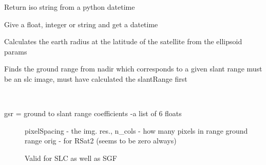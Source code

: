 \documentclass[letterpaper,10pt,english]{sphinxmanual}
\begin{document}

\begin{fulllineitems}
\label{code:Metadata.datetime2iso}
Return iso string from a python datetime

\end{fulllineitems}


\begin{fulllineitems}
\label{code:Metadata.doy2date}
Give a float, integer or string and get a datetime

\end{fulllineitems}


\begin{fulllineitems}
\label{code:Metadata.getEarthRadius}
Calculates the earth radius at the latitude of the satellite from the ellipsoid params

\end{fulllineitems}


\begin{fulllineitems}
\label{code:Metadata.getGroundRange}
Finds the ground range from nadir which corresponds to a given slant range
must be an slc image, must have calculated the slantRange first

\end{fulllineitems}


\begin{fulllineitems}
\label{code:Metadata.getSlantRange}~\begin{description}
\item[{gsr = ground to slant range coefficients -a list of 6 floats}] \leavevmode
pixelSpacing - the img. res., n\_cols - how many pixels in range
ground range orig - for RSat2 (seems to be zero always)

Valid for SLC as well as SGF

\end{description}

\end{fulllineitems}
\end{document}
